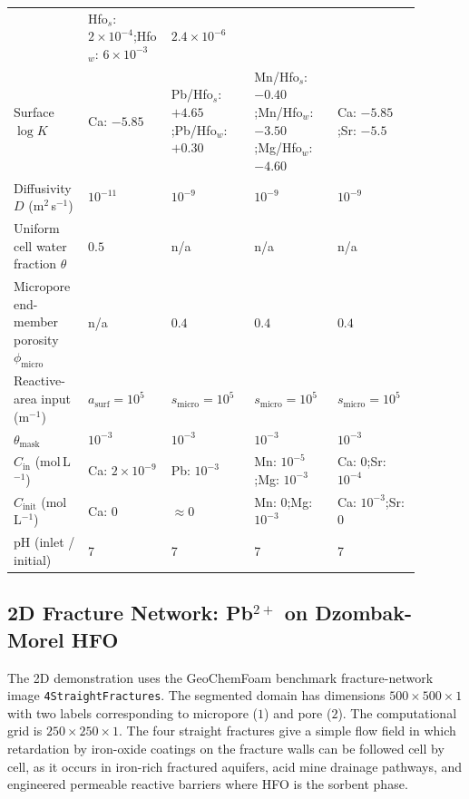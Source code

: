 \begin{table}[htbp]
\begin{tabular}{@{}p{0.13\linewidth}p{0.19\linewidth}p{0.19\linewidth}p{0.19\linewidth}p{0.19\linewidth}@{}}
            & Hfo$_s$: $2\times10^{-4}$;\enspace Hfo$_w$: $6\times10^{-3}$
            & $2.4\times10^{-6}$ \\
        Surface $\log K$
            & Ca: $-5.85$
            & Pb/Hfo$_s$: $+4.65$;\enspace Pb/Hfo$_w$: $+0.30$
            & Mn/Hfo$_s$: $-0.40$;\enspace Mn/Hfo$_w$: $-3.50$;\enspace Mg/Hfo$_w$: $-4.60$
            & Ca: $-5.85$;\enspace Sr: $-5.5$ \\
        Diffusivity $D$ (m$^2$\,s$^{-1}$)
            & $10^{-11}$
            & $10^{-9}$
            & $10^{-9}$
            & $10^{-9}$ \\
        Uniform cell water fraction $\theta$
            & $0.5$
            & n/a
            & n/a
            & n/a \\
        Micropore end-member porosity $\phi_{\mathrm{micro}}$
            & n/a
            & $0.4$
            & $0.4$
            & $0.4$ \\
        Reactive-area input (m$^{-1}$)
            & $a_{\mathrm{surf}}=10^{5}$
            & $s_{\mathrm{micro}}=10^{5}$
            & $s_{\mathrm{micro}}=10^{5}$
            & $s_{\mathrm{micro}}=10^{5}$ \\
        $\theta_{\mathrm{mask}}$
            & $10^{-3}$
            & $10^{-3}$
            & $10^{-3}$
            & $10^{-3}$ \\
        $C_{\mathrm{in}}$ (mol\,L$^{-1}$)
            & Ca: $2\times10^{-9}$
            & Pb: $10^{-3}$
            & Mn: $10^{-5}$;\enspace Mg: $10^{-3}$
            & Ca: $0$;\enspace Sr: $10^{-4}$ \\
        $C_{\mathrm{init}}$ (mol\,L$^{-1}$)
            & Ca: $0$
            & $\approx 0$
            & Mn: $0$;\enspace Mg: $10^{-3}$
            & Ca: $10^{-3}$;\enspace Sr: $0$ \\
        pH (inlet / initial)
            & 7
            & 7
            & 7
            & 7 \\
        \bottomrule
    \end{tabular}
\end{table}

\FloatBarrier

\subsection{\texorpdfstring{2D Fracture Network: Pb$^{2+}$ on
Dzombak-Morel HFO}{2D Fracture Network: Pb2+ on Dzombak-Morel HFO}}

The 2D demonstration uses the GeoChemFoam benchmark fracture-network image
\nolinkurl{4StraightFractures}. The segmented domain has dimensions
$500 \times 500 \times 1$ with two labels corresponding to micropore ($1$) and
pore ($2$). The computational grid is $250 \times 250 \times 1$.
The four straight fractures give a simple flow field in which retardation by
iron-oxide coatings on the fracture walls can be followed cell by cell, as it
occurs in iron-rich fractured aquifers, acid mine drainage pathways, and
engineered permeable reactive barriers where HFO is the sorbent phase.

